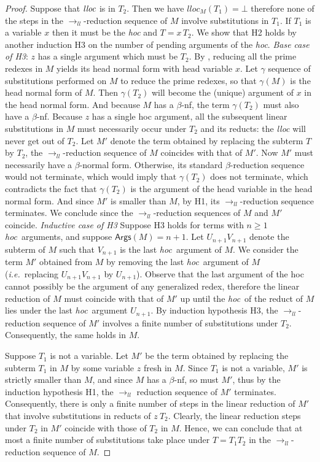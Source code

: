 \documentclass[xchauthor,chkrefs,GCNS,amsmath,amsthm,rotating,leaveRGB]{tcsg}
\theoremstyle{plain}
\theoremstyle{definition}
\newcommand{\llred}{\rightarrow_{ll}}
\newcommand{\hoc}{\emph{hoc}}
\begin{document}
\begin{proof}
Suppose that $\emph{lloc}$ is in $T_{2}$. Then we have $lloc_{M}(T_{1}) =\bot
$ therefore none of the steps in the $\llred $-reduction sequence of $M$
involve substitutions in $T_{1}$. If $T_{1}$ is a variable $x$ then it must
be the \emph{hoc} and $T = x\,T_{2}$. We show that H2 holds by another
induction H3 on the number of pending arguments of the \emph{hoc}. \emph{Base
case of H3}: $z$ has a single argument which must be $T_{2}$. By
, reducing all the prime
redexes in $M$ yields its head normal form with head variable $x$. Let
$\gamma $  sequence of substitutions performed
on $M$ to reduce the prime redexes, so that $\gamma (M)$ is the head normal
form of $M$.  Then $\gamma (T_{2})$ will become the (unique) argument of $x$
in the head normal form. And because $M$ has a $\beta $-nf, the term $\gamma
(T_{2})$ must also have a $\beta $-nf. Because $z$ has a single hoc argument,
all the subsequent linear substitutions in $M$ must necessarily occur under
$T_{2}$ and its reducts: the \emph{lloc} will never get out of $T_{2}$. Let
$M'$ denote the term obtained by replacing the subterm $T$ by $T_{2}$, the
$\llred $-reduction sequence of $M$ coincides with that of $M'$. Now $M'$
must necessarily have a $\beta $-normal form. Otherwise, its standard $\beta
$-reduction sequence would not terminate, which would imply that $\gamma
(T_{2})$ does not terminate, which contradicts the fact that $\gamma (T_{2})$
is the argument of the head variable in the head normal form. And since $M'$
is smaller than $M$, by H1, its $\llred $-reduction sequence terminates. We
conclude since the $\llred $-reduction sequences of $M$ and $M'$ coincide.
\emph{Inductive case of H3} Suppose H3  holds for terms with $n \geq 1$ \hoc\
arguments, and suppose $\mathsf{Args}(M) = n+1$. Let $U_{n+1} V_{n+1}$ denote
the subterm of $M$ such that $V_{n+1}$ is the last \hoc\ argument of $M$. We
consider the term $M'$ obtained from $M$ by removing the last \hoc\ argument
of $M$ (\textit{i.e.}~replacing $U_{n+1} V_{n+1}$ by $U_{n+1}$). Observe that
the last argument of the hoc cannot possibly be the argument of any
generalized redex, therefore the linear reduction of $M$ must  coincide with
that of $M'$ up until the \hoc\ of the reduct of $M$ lies under the last
\hoc\ argument $U_{n+1}$. By induction hypothesis H3, the $\llred $-reduction
sequence of $M'$ involves a finite number of substitutions under $T_{2}$.
Consequently, the same holds in $M$.


Suppose $T_{1}$ is not a variable. Let $M'$ be the term obtained by replacing
the subterm $T_{1}$ in $M$ by some variable $z$ fresh in $M$. Since $T_{1}$
is not a variable, $M'$ is strictly smaller than $M$, and since $M$ has a
$\beta $-nf, so must $M'$, thus by the induction hypothesis H1, the $\llred $
reduction sequence of $M'$ terminates. Consequently, there is only a finite
number of steps in the linear reduction of $M'$ that involve substitutions in
reducts of $z~T_{2}$. Clearly, the linear reduction steps under $T_{2}$ in
$M'$ coincide with those of $T_{2}$ in $M$. Hence, we can conclude that at
most a finite number of substitutions take place under $T= T_{1} T_{2}$ in
the $\llred $-reduction sequence of $M$.



\end{proof}
\end{document}
